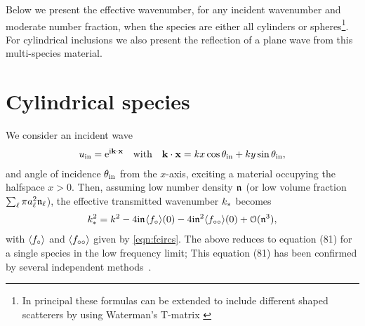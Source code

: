 \documentclass[12pt, a4paper]{article}
\begin{document}
Below we present the effective wavenumber, for any incident wavenumber and moderate number fraction, when the species are either all cylinders or spheres\footnote{In principal these formulas can be extended to include different shaped scatterers by using Waterman's T-matrix \cite{waterman_symmetry_1971,varadan_multiple_1978,mishchenko_t-matrix_1996}}.
  For cylindrical inclusions we also present the reflection of a plane wave from this multi-species material.





\section{Cylindrical species}

We consider an incident wave
\begin{gather}
  u_{\mathrm{in}} =  \textrm{e}^{\textrm{i} \mathbf k \cdot \mathbf x} \quad \text{with} \quad \mathbf k \cdot \mathbf x = k x \cos \theta_{\mathrm{in}}  + k y \sin \theta_{\mathrm{in}},
  \label{eqns:incident}
\end{gather}
and angle of incidence $\theta_{\mathrm{in}}$ from the $x$-axis, exciting a material occupying the halfspace $x>0$. Then, assuming low number density $\mathfrak n_{}$ (or low volume fraction $\sum_\ell \pi a_\ell^2 \mathfrak n_{\ell}$), the effective transmitted wavenumber $k_*$ becomes
\begin{align}
   k_*^2 = k^2 - 4 \textrm{i} \mathfrak n_{} \langle f_\circ \rangle(0) -  4 \textrm{i} \mathfrak n_{}^2 \langle f_{\circ\circ} \rangle(0)
   + \mathcal O(\mathfrak n_{}^3),
  \label{eqn:SmallNfracDiscrete}
\end{align}
with $\langle f_\circ \rangle$ and $\langle f_{\circ\circ} \rangle$ given by \eqref{eqn:fcircs}. The above reduces to \cite{linton_multiple_2005} equation (81) for a single species in the low frequency limit; This equation (81) has been confirmed by several independent methods~\cite{martin_estimating_2010,martin_multiple_2008,chekroun_time-domain_2012,kim_models_2010}.
\end{document}
